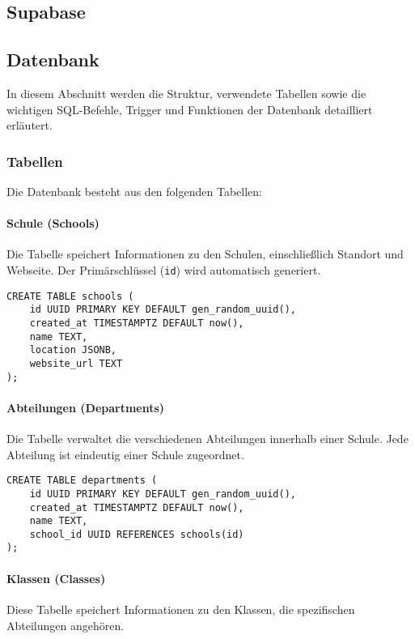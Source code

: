 \begin{inhalt}
\renewcommand*\chapterpagestyle{scrheadings}
\chapter{Supabase}

\section{Datenbank}

In diesem Abschnitt werden die Struktur, verwendete Tabellen sowie die wichtigen SQL-Befehle, Trigger und Funktionen der Datenbank detailliert erläutert.

\subsection{Tabellen}

Die Datenbank besteht aus den folgenden Tabellen:

\subsubsection{Schule (Schools)}
Die Tabelle speichert Informationen zu den Schulen, einschließlich Standort und Webseite. Der Primärschlüssel (\texttt{id}) wird automatisch generiert.

\begin{lstlisting}[style=mysql]
CREATE TABLE schools (
    id UUID PRIMARY KEY DEFAULT gen_random_uuid(),
    created_at TIMESTAMPTZ DEFAULT now(),
    name TEXT,
    location JSONB,
    website_url TEXT
);
\end{lstlisting}

\subsubsection{Abteilungen (Departments)}
Die Tabelle verwaltet die verschiedenen Abteilungen innerhalb einer Schule. Jede Abteilung ist eindeutig einer Schule zugeordnet.

\begin{lstlisting}[style=mysql]
CREATE TABLE departments (
    id UUID PRIMARY KEY DEFAULT gen_random_uuid(),
    created_at TIMESTAMPTZ DEFAULT now(),
    name TEXT,
    school_id UUID REFERENCES schools(id)
);
\end{lstlisting}

\subsubsection{Klassen (Classes)}
Diese Tabelle speichert Informationen zu den Klassen, die spezifischen Abteilungen angehören.


\end{inhalt}
